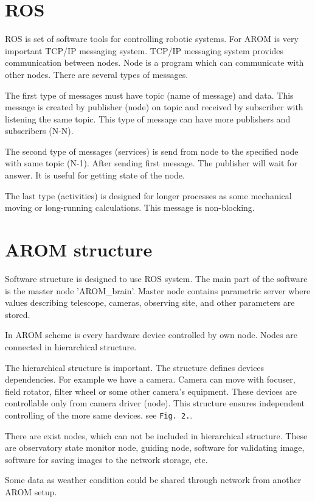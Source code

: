 \documentclass{poster16}
\begin{document}
\section{ROS}
ROS is set of software tools for controlling robotic systems. For AROM is very important TCP/IP messaging system. TCP/IP messaging system provides communication between nodes. Node is a program which can communicate with other nodes. There are several types of messages. 

The first type of messages must have topic (name of message) and data. This message is created by publisher (node) on topic and received by subscriber with listening the same topic. This type of message can have more publishers and subscribers (N-N).

The second type of messages (services) is send from node to the specified node with same topic (N-1). After sending first message. The publisher will wait for answer. It is useful for getting state of the node.

The last type (activities) is designed for longer processes as some mechanical moving or long-running calculations. This message is non-blocking.

\pagebreak
\section{AROM structure}
Software structure is designed to use ROS system. The main part of the software is the master node 'AROM\_brain'. Master node contains parametric server where values describing telescope, cameras, observing site, and other parameters are stored. 

In AROM scheme is every hardware device controlled by own node. Nodes are connected in hierarchical structure.

The hierarchical structure is important. The structure defines devices dependencies. For example we have a camera. Camera can move with focuser, field rotator, filter wheel or some other camera's equipment. These devices are controllable only from camera driver (node). This structure ensures independent controlling of the more same devices. see \texttt{Fig. 2.}.
 
There are exist nodes, which can not be included in hierarchical structure. These are observatory state monitor node, guiding node, software for validating image, software for saving images to the network storage, etc.

Some data as weather condition could be shared through network from another AROM setup.
\end{document}
